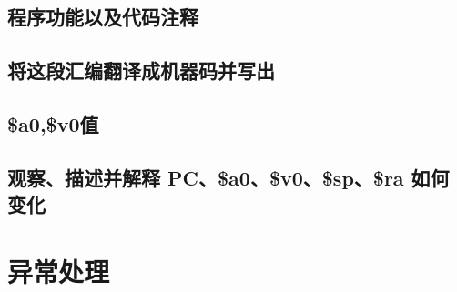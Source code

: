 \documentclass{article}
\begin{document}
\subsection{程序功能以及代码注释}
\subsection{将这段汇编翻译成机器码并写出}
\subsection{\$a0,\$v0值}
\subsection{观察、描述并解释 PC、\$a0、\$v0、\$sp、\$ra 如何变化}

\section{异常处理}

\end{document}
